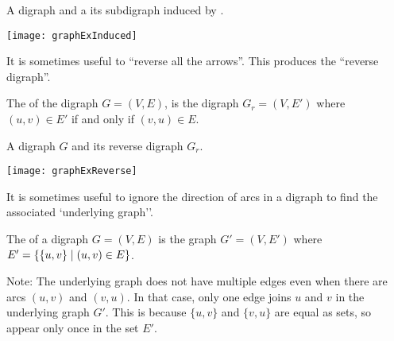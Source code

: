 \begin{Example}
A digraph and a its subdigraph induced by  .
\begin{center}
\texttt{[image: graphExInduced]}
\end{center}
\end{Example}


It is sometimes useful to ``reverse all the arrows''. This produces the ``reverse digraph''.

\begin{Definition}
The  of the digraph $G = (V, E)$, is the digraph $G_r = (V, E')$ where $(u, v)\in E'$ if and only if $(v, u)\in E$.
\end{Definition}

\begin{samepage}
\begin{Example}
A digraph $G$ and its reverse digraph $G_r$.
\begin{center}
\texttt{[image: graphExReverse]}
\end{center}
\end{Example}
\end{samepage}

It is sometimes useful to ignore the direction of arcs in a digraph to find the associated `underlying graph''.

\begin{Definition}
The  of a digraph $G = (V, E)$ is the graph 
$G' = (V, E')$ where $E' = \mbox{$\{\{u, v\} \mid (u, v)\in E\}$}$.
\end{Definition}


Note: The underlying graph does not have multiple edges even when there are arcs $(u, v)$ and $(v, u)$. 
In that case, only one edge joins $u$ and $v$ in the underlying graph $G'$.  
This is because $\{u, v\}$ and $\{v, u\}$ are equal as sets, so appear only once in the set $E'$.

